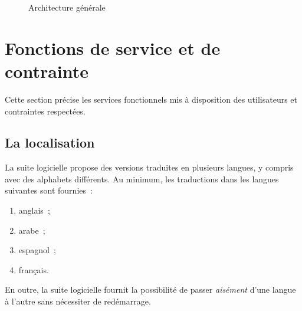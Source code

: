 \begin{figure}[htbp]
	\caption{Architecture générale}
	\label{ArchitecturePhysique}
\end{figure}

\section{Fonctions de service et de contrainte}
Cette section précise les services fonctionnels mis à disposition des utilisateurs et contraintes respectées.

\subsection{La localisation}
La suite logicielle propose des versions traduites en plusieurs langues, y compris avec des alphabets différents. Au minimum, les traductions dans les langues suivantes sont fournies~:
\begin{enumerate}[label=$\bullet$]
	\item anglais~;
	\item arabe~;
	\item espagnol~;
	\item français.
\end{enumerate}
En outre, la suite logicielle fournit la possibilité de passer \emph{aisément} d'une langue à l'autre sans nécessiter de redémarrage.

